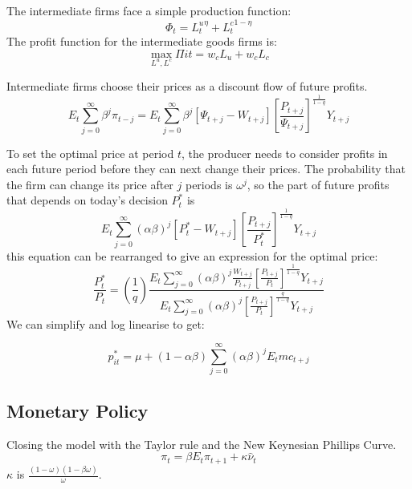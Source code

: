 \documentclass[11pt, a4paper]{article}
\begin{document}
The intermediate firms face a simple production function:
\begin{equation}
  \Phi_t = {L_t^u}^ \eta + {L^c_t}^{1-\eta}
\end{equation}
The profit function for the intermediate goods firms is:
\begin{equation}
  \max_{L^u, L^c} \Pi{it} = w_c L_u + w_c L_c
\end{equation}

Intermediate firms choose their prices as a discount flow of future profits. 
\begin{equation}
E_{t} \sum_{j=0}^{\infty} \beta^{j} \pi_{t-j}=E_{t} \sum_{j=0}^{\infty} \beta^{j}\left[\Psi_{t+j}-W_{t+j}\right]\left[\frac{P_{t+j}}{\Psi_{t+j}}\right]^{\frac{1}{1-q}} Y_{t+j}
\end{equation}

To set the optimal price at period $t$, the producer needs to consider profits in each future period before they can next change their prices. The probability that the firm can change its price after $j$ periods is $\omega^j$, so the part of future profits that depends on today’s decision $P^*_t$ is
\begin{equation}
E_{t} \sum_{j=0}^{\infty}(\alpha \beta)^{j}\left[P_{t}^{*}-W_{t+j}\right]\left[\frac{P_{t+j}}{P_{t}^{*}}\right]^{\frac{1}{1-q}} Y_{t+j}
\end{equation}
this equation can be rearranged to give an expression for the optimal price:
\begin{equation}
\frac{P_{t}^{*}}{P_{t}}=\left(\frac{1}{q}\right) \frac{E_{t} \sum_{j=0}^{\infty}(\alpha \beta)^{j} \frac{W_{t+j}}{P_{t+j}}\left[\frac{P_{t+j}}{P_{t}}\right]^{\frac{1}{1-q}} Y_{t+j}}{E_{t} \sum_{j=0}^{\infty}(\alpha \beta)^{j}\left[\frac{P_{t+j}}{P_{t}}\right]^{\frac{q}{1-q}} Y_{t+j}}
\end{equation}
We can simplify and log linearise to get:

\begin{equation}
p_{i t}^{*}=\mu+(1-\alpha \beta) \sum_{j=0}^{\infty}(\alpha \beta)^{j} E_{t} m c_{t+j}
\end{equation}

\subsection{Monetary Policy}

Closing the model with the Taylor rule and the New Keynesian Phillips Curve.
\begin{equation}
\pi_{t}=\beta E_{t} \pi_{t+1}+\kappa \hat{\nu}_{t}
\end{equation}
$\kappa$ is $\frac{(1-\omega)(1-\beta \omega)}{\omega}$.
\end{document}
